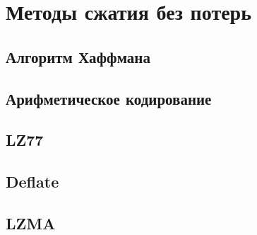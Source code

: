 \section{Методы сжатия без потерь}

\subsection{Алгоритм Хаффмана }

\subsection{Арифметическое кодирование}

\subsection{LZ77}

\subsection{Deflate}

\subsection{LZMA}